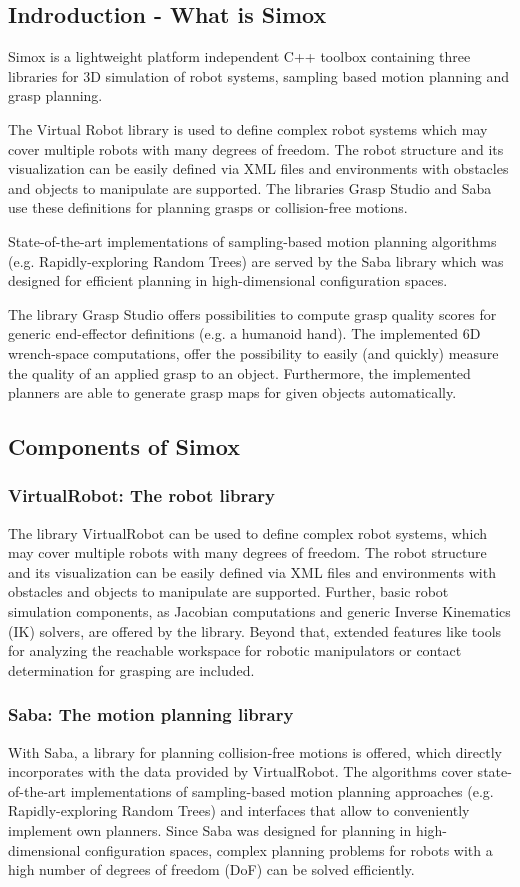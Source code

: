 \documentclass{book}
\begin{document}
\subsection{Indroduction - What is Simox}
Simox is a lightweight platform independent C++ toolbox containing three libraries for 3D simulation of robot systems, sampling based motion planning and grasp planning. \par The Virtual Robot library is used to define complex robot systems which may cover multiple robots with many degrees of freedom. The robot structure and its visualization can be easily defined via XML files and environments with obstacles and objects to manipulate are supported. The libraries Grasp Studio and Saba use these definitions for planning grasps or collision-free motions.\par State-of-the-art implementations of sampling-based motion planning algorithms (e.g. Rapidly-exploring Random Trees) are served by the Saba library which was designed for efficient planning in high-dimensional configuration spaces. \par The library Grasp Studio offers possibilities to compute grasp quality scores for generic end-effector definitions (e.g. a humanoid hand). The implemented 6D wrench-space computations, offer the possibility to easily (and quickly) measure the quality of an applied grasp to an object. Furthermore, the implemented planners are able to generate grasp maps for given objects automatically.
\subsection{Components of Simox}
\subsubsection{VirtualRobot: The robot library}
The library VirtualRobot can be used to define complex robot systems, which may cover multiple robots with many degrees of freedom. The robot structure and its visualization can be easily defined via XML files and environments with obstacles and objects to manipulate are supported. Further, basic robot simulation components, as Jacobian computations and generic Inverse Kinematics (IK) solvers, are offered by the library. Beyond that, extended features like tools for analyzing the reachable workspace for robotic manipulators or contact determination for grasping are included. 
\subsubsection{Saba: The motion planning library}
With Saba, a library for planning collision-free motions is offered, which directly incorporates with the data provided by VirtualRobot. The algorithms cover state-of-the-art implementations of sampling-based motion planning approaches (e.g. Rapidly-exploring Random Trees) and interfaces that allow to conveniently implement own planners. Since Saba was designed for planning in high-dimensional configuration spaces, complex planning problems for robots with a high number of degrees of freedom (DoF) can be solved efficiently. 
\end{document}
